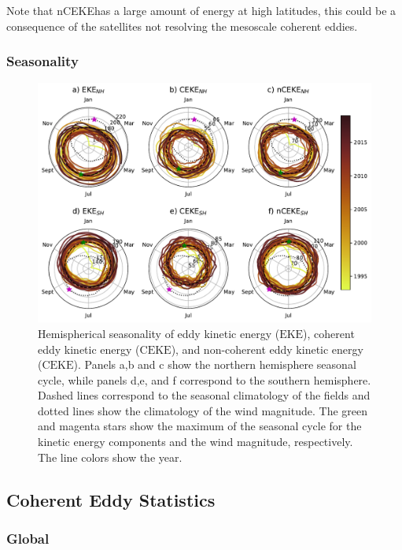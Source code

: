 \documentclass[draft]{agujournal2019}
\newcommand{\EKE}{\textrm{EKE}}
\newcommand{\CEKE}{\textrm{CEKE}}
\newcommand{\nCEKE}{\textrm{nCEKE}}
\begin{document}
	Note that \nCEKE has a large amount of energy at high latitudes, this could be a consequence of the satellites not resolving the mesoscale coherent eddies. 

	\subsubsection{Seasonality}

	\begin{figure}
	    \centering
	    \includegraphics[width=1\textwidth]{figures/All_polar_plots.pdf}
	    \caption{Hemispherical seasonality of eddy kinetic energy ($\EKE$), coherent eddy kinetic energy ($\CEKE$), and non-coherent eddy kinetic energy ($\CEKE$). Panels a,b and c show the northern hemisphere seasonal cycle, while panels d,e, and f correspond to the southern hemisphere. Dashed lines correspond to the seasonal climatology of the fields and dotted lines show the climatology of the wind magnitude. The green and magenta stars show the maximum of the seasonal cycle for the kinetic energy components and the wind magnitude, respectively. The line colors show the year.}
	    \label{fig:my_label}
	\end{figure}
	
	\subsection{Coherent Eddy Statistics}

	\subsubsection{Global}
	
\end{document}

